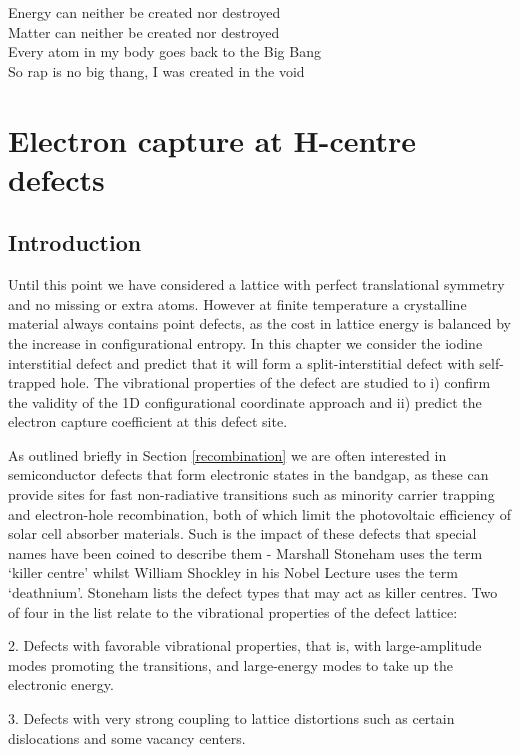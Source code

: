 \begin{savequote}[8cm]
Energy can neither be created nor destroyed \\
Matter can neither be created nor destroyed \\
Every atom in my body goes back to the Big Bang \\
So rap is no big thang, I was created in the void
\end{savequote}

\chapter{\label{ch:6-defects}Electron capture at H-centre defects}





\section{Introduction}

Until this point we have considered a lattice with perfect translational symmetry and no missing or extra atoms. However at finite temperature a crystalline material always contains point defects, as the cost in lattice energy is balanced by the increase in configurational entropy.
In this chapter we consider the iodine interstitial defect and predict that it will form a split-interstitial defect with self-trapped hole. The vibrational properties of the defect are studied to i) confirm the validity of the 1D configurational coordinate approach and ii) predict the electron capture coefficient at this defect site.

As outlined briefly in Section \ref{recombination} we are often interested in semiconductor defects that form electronic states in the bandgap, as these can provide sites for fast non-radiative transitions such as minority carrier trapping and electron-hole recombination, both of which limit the photovoltaic efficiency of solar cell absorber materials. Such is the impact of these defects that special names have been coined to describe them - Marshall Stoneham uses the term `killer centre' whilst William Shockley in his Nobel Lecture uses the term `deathnium'.\autocite{shockley}
Stoneham lists the defect types that may act as killer centres. Two of four in the list relate to the vibrational properties of the defect lattice:

\begin{displayquote}
2. Defects with favorable vibrational properties, that is, with large-amplitude modes promoting the transitions, and large-energy modes to take up the electronic energy.

3.  Defects with very strong coupling to lattice distortions such as certain dislocations and some vacancy centers.
\end{displayquote}

